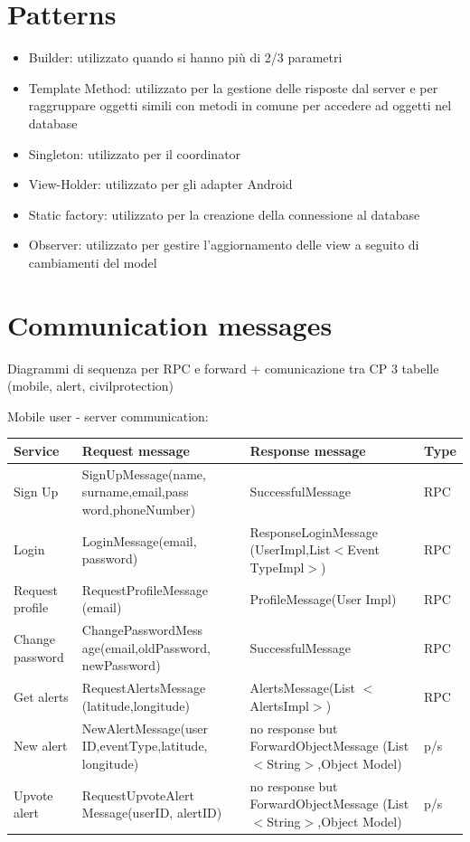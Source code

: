 \documentclass[a4paper,12pt]{report}
\begin{document}
\section{Patterns}
\begin{itemize}
\item Builder: utilizzato quando si hanno più di 2/3 parametri
\item Template Method: utilizzato per la gestione delle risposte dal server e per raggruppare oggetti simili con metodi in comune per accedere ad oggetti nel database
\item Singleton: utilizzato per il coordinator
\item View-Holder: utilizzato per gli adapter Android
\item Static factory: utilizzato per la creazione della connessione al database
\item Observer: utilizzato per gestire l'aggiornamento delle view a seguito di cambiamenti del model
\end{itemize}

\section{Communication messages}
Diagrammi di sequenza per RPC e forward + comunicazione tra CP
3 tabelle (mobile, alert, civilprotection)

Mobile user - server communication:

\begin{center}
\begin{tabular}{ |p{4cm}|p{4cm}|p{4cm}|p{2cm}| } 
\hline
Service 			& Request message 	& Response message		& Type 	\\
\hline
Sign Up  			& SignUpMessage(name, surname,email,pass word,phoneNumber)		& SuccessfulMessage 	& RPC	\\ 
Login 				& LoginMessage(email, password) 	& ResponseLoginMessage (UserImpl,List$<$Event TypeImpl$>$)	& RPC	\\ 
Request profile 	& RequestProfileMessage (email)		& ProfileMessage(User Impl)	& RPC	\\ 
Change password		& ChangePasswordMess age(email,oldPassword, newPassword)	& SuccessfulMessage	& RPC	\\
Get alerts		& RequestAlertsMessage (latitude,longitude)	& AlertsMessage(List $<$AlertsImpl$>$)	& RPC	\\
New alert		& NewAlertMessage(user ID,eventType,latitude, longitude)	& no response but ForwardObjectMessage (List$<$String$>$,Object Model)	& p/s	\\
Upvote alert		& RequestUpvoteAlert Message(userID, alertID)	& no response but ForwardObjectMessage (List$<$String$>$,Object Model)	& p/s	\\
\hline
\end{tabular}
\end{center}
\end{document}
